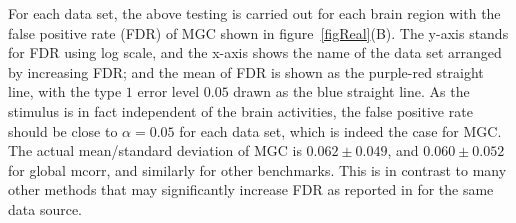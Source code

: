 \documentclass[11pt]{article}
\begin{document}
For each data set, the above testing is carried out for each brain region with the false positive rate (FDR) of MGC shown in figure~\ref{figReal}(B). The y-axis stands for FDR using log scale, and the x-axis shows the name of the data set arranged by increasing FDR; and the mean of FDR is shown as the purple-red straight line, with the type $1$ error level $0.05$ drawn as the blue straight line. As the stimulus is in fact independent of the brain activities, the false positive rate should be close to $\alpha=0.05$ for each data set, which is indeed the case for MGC. The actual mean/standard deviation of MGC is $0.062 \pm 0.049$, and $0.060 \pm 0.052$ for global mcorr, and similarly for other benchmarks. This is in contrast to many other methods that may significantly increase FDR as reported in \cite{EklundKnutsson2012} for the same data source.
%
%
%
%
%
%
%
%
%
%
%
%
%
%
%
%
%
%
\end{document}
